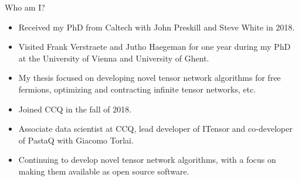 \begin{frame}{Who am I?}

\begin{itemize}[<+->]

  \item Received my PhD from Caltech with John Preskill and Steve White in 2018.
  \item Visited Frank Verstraete and Jutho Haegeman for one year during my PhD at the University of Vienna and University of Ghent.
  \item My thesis focused on developing novel tensor network algorithms for free fermions, optimizing and contracting infinite tensor networks, etc.
  \item Joined CCQ in the fall of 2018.
  \item Associate data scientist at CCQ, lead developer of ITensor and co-developer of PastaQ with Giacomo Torlai.
  \item Continuing to develop novel tensor network algorithms, with a focus on making them available as open source software.

\end{itemize}

\end{frame}
